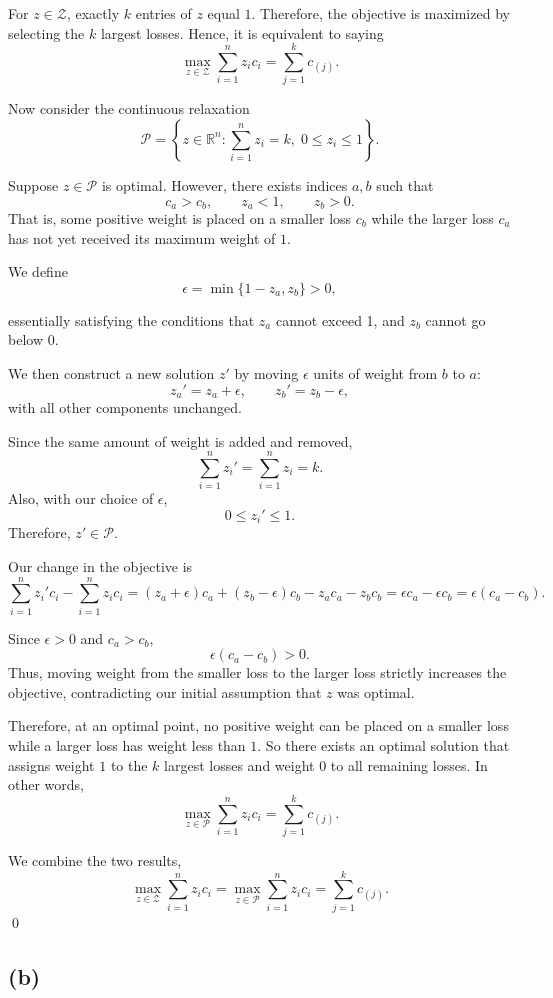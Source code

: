 \documentclass{article}
\begin{document}
For $z\in\mathcal Z$, exactly $k$ entries of $z$ equal $1$. Therefore,
the objective is maximized by selecting the $k$ largest losses. Hence, it is equivalent to saying
\[
\max_{z\in\mathcal Z}\sum_{i=1}^n z_i c_i
=
\sum_{j=1}^k c_{(j)}.
\]

Now consider the continuous relaxation
\[
\mathcal P
=
\left\{
z\in\mathbb R^n:
\sum_{i=1}^n z_i=k,\;
0\leq z_i\leq 1
\right\}.
\]

Suppose $z\in\mathcal P$ is optimal. However, there exists indices $a,b$ such that
\[
c_a>c_b,
\qquad
z_a<1,
\qquad
z_b>0.
\]
That is, some positive weight is placed on a smaller loss $c_b$ while
the larger loss $c_a$ has not yet received its maximum weight of $1$.

We define 
\[
\epsilon=\min\{1-z_a,z_b\}>0,
\]

essentially satisfying the conditions that $z_a$ cannot exceed 1, and $z_b$ cannot go below 0. 

We then construct a new solution $z'$ by moving $\epsilon$ units of weight from
$b$ to $a$:
\[
z_a'=z_a+\epsilon,
\qquad
z_b'=z_b-\epsilon,
\]
with all other components unchanged.

Since the same amount of weight is added and removed,
\[
\sum_{i=1}^n z_i'
=
\sum_{i=1}^n z_i
=
k.
\]
Also, with our choice of $\epsilon$, 
\[
0\leq z_i'\leq1.
\]
Therefore, $z'\in\mathcal P$.

Our change in the objective is
\[
\sum_{i=1}^n z_i'c_i-\sum_{i=1}^n z_ic_i
=
(z_a+\epsilon)c_a+(z_b-\epsilon)c_b
-z_ac_a-z_bc_b =
\epsilon c_a-\epsilon c_b
=
\epsilon(c_a-c_b).
\]


Since $\epsilon>0$ and $c_a>c_b$,
\[
\epsilon(c_a-c_b)>0.
\]
Thus, moving weight from the smaller loss to the larger loss strictly
increases the objective, contradicting our initial assumption that $z$ was
optimal.

Therefore, at an optimal point, no positive weight can be placed on a smaller
loss while a larger loss has weight less than $1$. So there exists
an optimal solution that assigns weight $1$ to the $k$ largest losses
and weight $0$ to all remaining losses. In other words, 
\[
\max_{z\in\mathcal P}\sum_{i=1}^n z_i c_i
=
\sum_{j=1}^k c_{(j)}.
\]

We combine the two results,
\[
\max_{z\in\mathcal Z}\sum_{i=1}^n z_i c_i
=
\max_{z\in\mathcal P}\sum_{i=1}^n z_i c_i
=
\sum_{j=1}^k c_{(j)}.
\] \qed


\vspace{5mm}
\subsection*{(b)}
\end{document}
